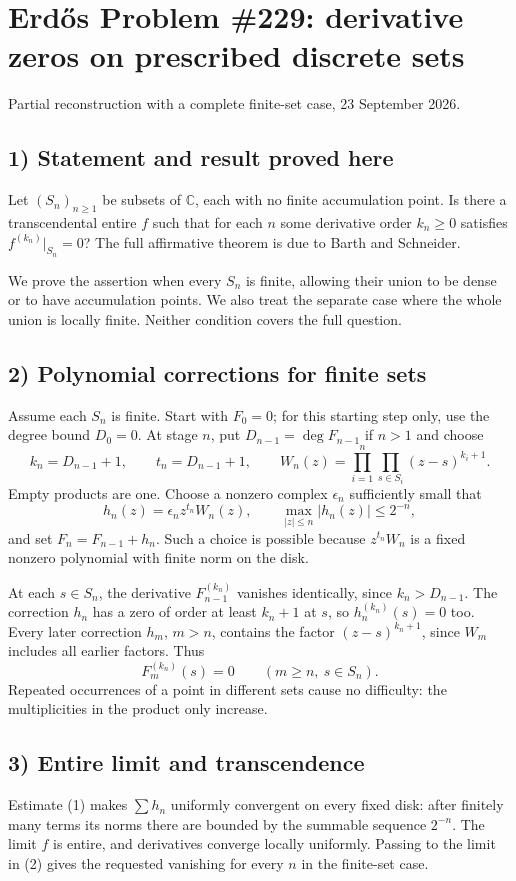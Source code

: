 \section{Erd\H{o}s Problem \#229: derivative zeros on prescribed discrete sets}
\noindent Partial reconstruction with a complete finite-set case, 23 September 2026.

\subsection*{1) Statement and result proved here}
Let $(S_n)_{n\ge1}$ be subsets of $\mathbb C$, each with no finite accumulation point. Is there a transcendental entire $f$ such that for each $n$ some derivative order $k_n\ge0$ satisfies $f^{(k_n)}|_{S_n}=0$? The full affirmative theorem is due to Barth and Schneider.

We prove the assertion when every $S_n$ is finite, allowing their union to be dense or to have accumulation points. We also treat the separate case where the whole union is locally finite. Neither condition covers the full question.

\subsection*{2) Polynomial corrections for finite sets}
Assume each $S_n$ is finite. Start with $F_0=0$; for this starting step only, use the degree bound $D_0=0$. At stage $n$, put $D_{n-1}=\deg F_{n-1}$ if $n>1$ and choose
\[
 k_n=D_{n-1}+1,\qquad t_n=D_{n-1}+1,
 \qquad W_n(z)=\prod_{i=1}^n\prod_{s\in S_i}(z-s)^{k_i+1}.
\]
Empty products are one. Choose a nonzero complex $\epsilon_n$ sufficiently small that
\[
 h_n(z)=\epsilon_n z^{t_n}W_n(z),\qquad
 \max_{|z|\le n}|h_n(z)|\le2^{-n},\tag{1}
\]
and set $F_n=F_{n-1}+h_n$. Such a choice is possible because $z^{t_n}W_n$ is a fixed nonzero polynomial with finite norm on the disk.

At each $s\in S_n$, the derivative $F_{n-1}^{(k_n)}$ vanishes identically, since $k_n>D_{n-1}$. The correction $h_n$ has a zero of order at least $k_n+1$ at $s$, so $h_n^{(k_n)}(s)=0$ too. Every later correction $h_m$, $m>n$, contains the factor $(z-s)^{k_n+1}$, since $W_m$ includes all earlier factors. Thus
\[
 F_m^{(k_n)}(s)=0\qquad(m\ge n,\ s\in S_n).\tag{2}
\]
Repeated occurrences of a point in different sets cause no difficulty: the multiplicities in the product only increase.

\subsection*{3) Entire limit and transcendence}
Estimate (1) makes $\sum h_n$ uniformly convergent on every fixed disk: after finitely many terms its norms there are bounded by the summable sequence $2^{-n}$. The limit $f$ is entire, and derivatives converge locally uniformly. Passing to the limit in (2) gives the requested vanishing for every $n$ in the finite-set case.

